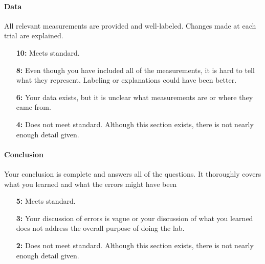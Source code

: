 \documentclass[10pt]{exam}
\begin{document}
\paragraph{Data} All relevant measurements are provided and well-labeled.  Changes made at each trial are explained.	
\begin{itemize}
  \item[\bf 10:] Meets standard.	
  \item[\bf 8:] Even though you have included all of the measurements, it is hard to tell what they represent. Labeling or explanations could have been better. 
  \item[\bf 6:] Your data exists, but it is unclear what measurements are or where they came from.
  \item[\bf 4:] Does not meet standard.  Although this section exists, there is not nearly enough detail given.
\end{itemize}

\paragraph{Conclusion} Your conclusion is complete and answers all of the questions.  It thoroughly covers what you learned and what the errors might have been	
\begin{itemize}
  \item[\bf 5:] Meets standard.	
  \item[\bf 3:] Your discussion of errors is vague or your discussion of what you learned does not address the overall purpose of doing the lab.
  \item[\bf 2:]Does not meet standard. Although this section exists, there is not nearly enough detail given.
\end{itemize}
\end{document}
